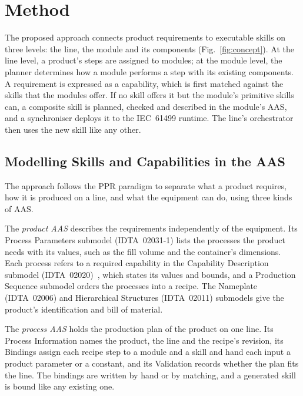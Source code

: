 \documentclass[5p,times,procedia]{elsarticle}
\begin{document}
\section{Method}
\label{sec:method}

The proposed approach connects product requirements to executable skills on three levels: the line, the module and its components (Fig.~\ref{fig:concept}). At the line level, a product's steps are assigned to modules; at the module level, the planner determines how a module performs a step with its existing components. A requirement is expressed as a capability, which is first matched against the skills that the modules offer. If no skill offers it but the module's primitive skills can, a composite skill is planned, checked and described in the module's AAS, and a synchroniser deploys it to the IEC~61499 runtime. The line's orchestrator then uses the new skill like any other.

\subsection{Modelling Skills and Capabilities in the AAS}
\label{sec:model}

The approach follows the PPR paradigm to separate what a product requires, how it is produced on a line, and what the equipment can do, using three kinds of AAS.

The \emph{product AAS} describes the requirements independently of the equipment. Its Process Parameters submodel (IDTA~02031-1) lists the processes the product needs with its values, such as the fill volume and the container's dimensions. Each process refers to a required capability in the Capability Description submodel (IDTA~02020)~\cite{idta02020}, which states its values and bounds, and a Production Sequence submodel orders the processes into a recipe. The Nameplate (IDTA~02006) and Hierarchical Structures (IDTA~02011) submodels give the product's identification and bill of material.

The \emph{process AAS} holds the production plan of the product on one line. Its Process Information names the product, the line and the recipe's revision, its Bindings assign each recipe step to a module and a skill and hand each input a product parameter or a constant, and its Validation records whether the plan fits the line. The bindings are written by hand or by matching, and a generated skill is bound like any existing one.
\end{document}
